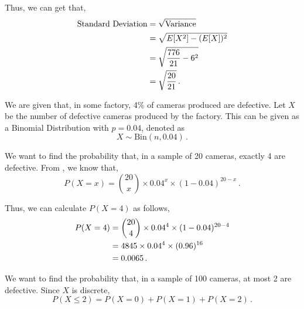\begin{subquestions}
\begin{subsubquestions}
Thus, we can get that,
\begin{align}
	\text{Standard Deviation} & = \sqrt{\text{Variance}} \nonumber \\
	                          & = \sqrt{E[X^2] - (E[X])^2} \nonumber \\
	                          & = \sqrt{\frac{776}{21}- 6^2} \nonumber \\
	                          & = \sqrt{\frac{20}{21}} \,.
\end{align}

\end{subsubquestions}
	
	
\subquestion

We are given that, in some factory, 4\% of cameras produced are defective. Let $X$ be the number of defective cameras produced by the factory. This can be given as a Binomial Distribution with $p=0.04$, denoted as
\begin{equation}
	X \sim \text{Bin}(n,0.04) \,.
\end{equation}

\begin{subsubquestions}
	
\subsubquestion

We want to find the probability that, in a sample of 20 cameras, exactly 4 are defective. From , we know that,
\begin{equation}
	P(X = x) = { 20 \choose x} \times 0.04^x \times (1-0.04)^{20-x} \,.
\end{equation}

Thus, we can calculate $P(X=4)$ as follows,
\begin{align}
	P(X = 4) & = { 20 \choose 4} \times 0.04^4 \times (1-0.04)^{20-4} \nonumber \\
	         & = 4845 \times 0.04^4 \times (0.96)^{16} \nonumber \\
	         & = 0.0065 \,.
\end{align}


\subsubquestion

We want to find the probability that, in a sample of 100 cameras, at most 2 are defective. Since $X$ is discrete,
\begin{equation}
	P(X \leq 2) = P(X=0)+P(X=1)+P(X=2) \,.
\end{equation}


\end{subsubquestions}
\end{subquestions}
